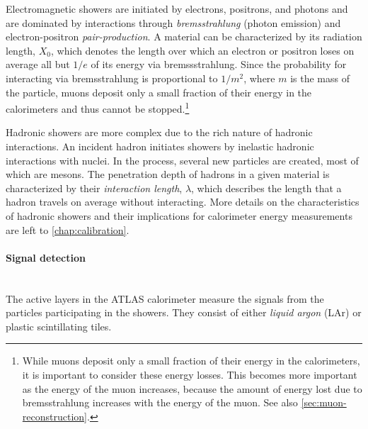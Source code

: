 Electromagnetic showers are initiated by electrons, positrons, and photons and are dominated by interactions through \emph{bremsstrahlung} (photon emission) and electron-positron \emph{pair-production}.
A material can be characterized by its radiation length, $X_0$, which denotes the length over which an electron or positron loses on average all but  $1/e$ of its energy via bremssstrahlung. Since the probability for interacting via bremsstrahlung is proportional to $1 / m^2$, where $m$ is the mass of the particle, muons deposit only a small fraction of their energy in the calorimeters and thus cannot be stopped.\footnote{While muons deposit only a small fraction of their energy in the calorimeters, it is important to consider these energy losses. This becomes more important as the energy of the muon increases, because the amount of energy lost due to bremsstrahlung increases with the energy of the muon. See also \cref{sec:muon-reconstruction}.}

Hadronic showers are more complex due to the rich nature of hadronic interactions. An incident hadron initiates showers by inelastic hadronic interactions with nuclei. In the process, several new particles are created, most of which are mesons.
The penetration depth of hadrons in a given material is characterized by their \emph{interaction length}, $\lambda$, which describes the length that a hadron travels on average without interacting.
More details on the characteristics of hadronic showers and their implications for calorimeter energy measurements are left to \cref{chap:calibration}.

\paragraph{Signal detection}\mbox{}\\
The active layers in the ATLAS calorimeter measure the signals from the particles participating in the showers. They consist of either \emph{liquid argon} (LAr) or plastic scintillating tiles.

